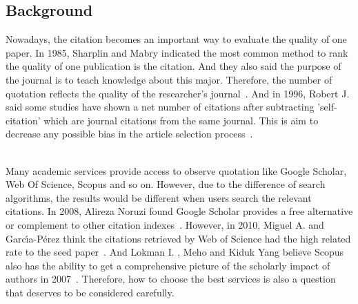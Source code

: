 \documentclass[runningheads]{llncs}
\begin{document}
\subsection{Background }
Nowadays, the citation becomes an important way to evaluate the quality of one paper. In 1985, Sharplin and Mabry indicated the most common method to rank the quality of one publication is the citation. And they also said the purpose of the journal is to teach knowledge about this major. Therefore, the number of quotation reflects the quality of the researcher's journal~\cite{sharplin1985relative}. And in 1996, Robert J. said some studies have shown a net number of citations after subtracting 'self-citation' which are journal citations from the same journal. This is aim to decrease any possible bias in the article selection process~\cite{vokurka1996relative}.
\par\noindent
\\
Many academic services provide access to observe quotation like Google Scholar, Web Of Science, Scopus and so on. However, due to the difference of search algorithms, the results would be different when users search the relevant citations. In 2008, Alireza Noruzi found Google Scholar provides a free alternative or complement to other citation indexes~\cite{harzing2008google}. However, in 2010, Miguel A. and Garc{\'\i}a-P{\'e}rez think the citations retrieved by Web of Science had the high related rate to the seed paper~\cite{garcia2010accuracy}. And Lokman I. , Meho and Kiduk Yang believe Scopus also has the ability to get a comprehensive picture of the scholarly impact of authors in 2007~\cite{meho2007impact}. Therefore, how to choose the best services is also a question that deserves to be considered carefully.
\end{document}
